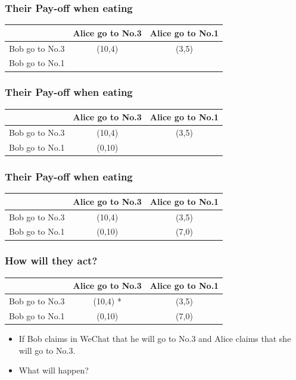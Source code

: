 \documentclass{beamer}
\begin{document}
\begin{frame}
\frametitle{Their Pay-off when eating}
\begin{tabular}{|c|c|c|}
\hline
\hline
    & {\color{red}Alice} go to No.3 & {\color{red}Alice} go to No.1\\
\hline
{\color{blue}Bob} go to No.3 & ({\color{blue}10},{\color{red}4}) & ({\color{blue}3},{\color{red}5})\\
\hline
{\color{blue}Bob} go to No.1 &  & \\
\hline
\hline
\end{tabular}
\end{frame}

\begin{frame}
\frametitle{Their Pay-off when eating}
\begin{tabular}{|c|c|c|}
\hline
\hline
    & {\color{red}Alice} go to No.3 & {\color{red}Alice} go to No.1\\
\hline
{\color{blue}Bob} go to No.3 & ({\color{blue}10},{\color{red}4}) & ({\color{blue}3},{\color{red}5})\\
\hline
{\color{blue}Bob} go to No.1 & ({\color{blue}0},{\color{red}10}) & \\
\hline
\hline
\end{tabular}
\end{frame}

\begin{frame}
\frametitle{Their Pay-off when eating}
\begin{tabular}{|c|c|c|}
\hline
\hline
    & {\color{red}Alice} go to No.3 & {\color{red}Alice} go to No.1\\
\hline
{\color{blue}Bob} go to No.3 & ({\color{blue}10},{\color{red}4}) & ({\color{blue}3},{\color{red}5})\\
\hline
{\color{blue}Bob} go to No.1 & ({\color{blue}0},{\color{red}10}) & ({\color{blue}7},{\color{red}0})\\
\hline
\hline
\end{tabular}
\end{frame}

\begin{frame}
\frametitle{How will they act?}
\begin{tabular}{|c|c|c|}
\hline
\hline
    & {\color{red}Alice} go to No.3 & {\color{red}Alice} go to No.1\\
\hline
{\color{blue}Bob} go to No.3 & ({\color{blue}10},{\color{red}4}) {\color{green}*}& ({\color{blue}3},{\color{red}5})\\
\hline
{\color{blue}Bob} go to No.1 & ({\color{blue}0},{\color{red}10}) & ({\color{blue}7},{\color{red}0})\\
\hline
\hline
\end{tabular}
\begin{itemize}
\item
If {\color{blue}Bob} claims in WeChat that he will go to No.3 and {\color{red}Alice} claims that she will go to No.3.

\item What will happen?
\end{itemize}
\end{frame}
\end{document}

